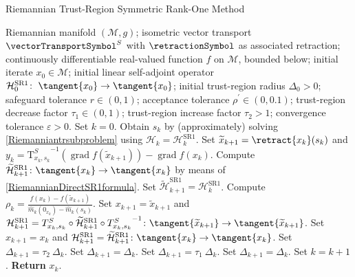 \begin{algorithm}[H]
    \caption{Riemannian Trust-Region Symmetric Rank-One Method}\label{RTR-SR1Method}
    \begin{algorithmic}[1]
        \State Riemannian manifold $(\mathcal{M}, g)$; isometric vector transport $\vectorTransportSymbol^S$ with $\retractionSymbol$ as associated retraction; continuously differentiable real-valued function $f$ on $\mathcal{M}$, bounded below; initial iterate $x_0 \in \mathcal{M}$; initial linear self-adjoint operator $\mathcal{H}^\mathrm{SR1}_0 \colon \; \tangent{x_0} \to \tangent{x_0}$; initial trust-region radius $\Delta_0 > 0$; safeguard tolerance $r \in (0,1)$; acceptance tolerance $\rho^{\prime} \in (0, 0.1)$; trust-region decrease factor $\tau_1 \in (0,1)$; trust-region increase factor $\tau_2 > 1$; convergence tolerance $\varepsilon > 0$. Set $k = 0$.
            \State Obtain $s_k$ by (approximately) solving \cref{Riemanniantrsubproblem} using $\mathcal{H}_k = \mathcal{H}^\mathrm{SR1}_k$.
            \State Set $\widetilde{x}_{k+1} = \retract{x_k}(s_k)$ and $y_k = {\mathrm{T}^{S}_{x_k, s_k}}^{-1} ( \operatorname{grad}f(\widetilde{x}_{k+1}) ) - \operatorname{grad}f(x_k)$.
                \State Compute $\widetilde{\mathcal{H}}^\mathrm{SR1}_{k+1} \colon \tangent{x_{k}} \to \tangent{x_{k}}$ by means of \cref{RiemannianDirectSR1formula}.
			\Else 
				\State Set $\widetilde{\mathcal{H}}^\mathrm{SR1}_{k+1} = \mathcal{H}^\mathrm{SR1}_k$.
            \EndIf 
            \State Compute $\rho_k = \frac{f(x_k) - f(\widetilde{x}_{k+1})}{\hat{m}_k(0_{x_k}) - \hat{m}_k(s_k)}$.
                \State Set $x_{k+1} = \widetilde{x}_{k+1}$ and $\mathcal{H}^\mathrm{SR1}_{k+1} = T^{S}_{x_k, s_k} \circ \widetilde{\mathcal{H}}^\mathrm{SR1}_{k+1} \circ  {T^{S}_{x_k, s_k}}^{-1} \colon \tangent{\widetilde{x}_{k+1}} \to \tangent{\widetilde{x}_{k+1}}$.
			\Else 
				\State Set $x_{k+1} = x_k$ and $\mathcal{H}^\mathrm{SR1}_{k+1} = \widetilde{\mathcal{H}}^\mathrm{SR1}_{k+1} \colon \tangent{x_{k}} \to \tangent{x_{k}}$.
            \EndIf 
                    \State Set $\Delta_{k+1} = \tau_2 \ \Delta_k$.
                \Else 
                    \State Set $\Delta_{k+1} = \Delta_k$.
                \EndIf 
			\Else 
                    \State Set $\Delta_{k+1} = \tau_1 \ \Delta_k$.
                \Else 
                    \State Set $\Delta_{k+1} = \Delta_k$.
                \EndIf 
            \EndIf 
            \State Set $k = k+1$.
        \EndWhile
        \State \textbf{Return} $x_k$.
    \end{algorithmic}
\end{algorithm}
